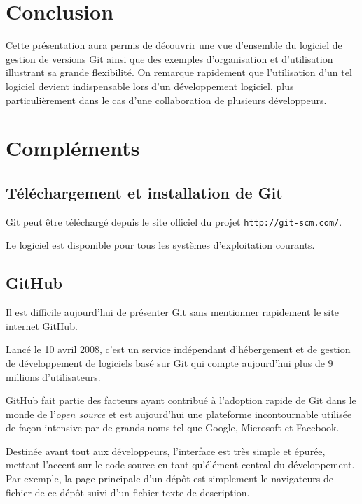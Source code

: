 \documentclass[11pt,a4paper]{article}
\begin{document}
\section{Conclusion}

Cette présentation aura permis de découvrir une vue d'ensemble du logiciel de gestion de versions Git ainsi que des exemples d'organisation et d'utilisation illustrant sa grande flexibilité. On remarque rapidement que l'utilisation d'un tel logiciel devient indispensable lors d'un développement logiciel, plus particulièrement dans le cas d'une collaboration de plusieurs développeurs.

\pagebreak
{}
\section{Compléments}

\subsection{Téléchargement et installation de Git}

Git peut être téléchargé depuis le site officiel du projet {\tt http://git-scm.com/}.

Le logiciel est disponible pour tous les systèmes d'exploitation courants.

\subsection{GitHub}

Il est difficile aujourd'hui de présenter Git sans mentionner rapidement le site internet GitHub.

Lancé le 10 avril 2008, c'est un service indépendant d'hébergement et de gestion de développement de logiciels basé sur Git qui compte aujourd'hui plus de 9 millions d'utilisateurs.

GitHub fait partie des facteurs ayant contribué à l'adoption rapide de Git dans le monde de l'\textit{open source} et est aujourd'hui une plateforme incontournable utilisée de façon intensive par de grands noms tel que Google, Microsoft et Facebook. 

Destinée avant tout aux développeurs, l'interface est très simple et épurée, mettant l'accent sur le code source en tant qu'élément central du développement. Par exemple, la page principale d'un dépôt est simplement le navigateurs de fichier de ce dépôt suivi d'un fichier texte de description.
\end{document}
